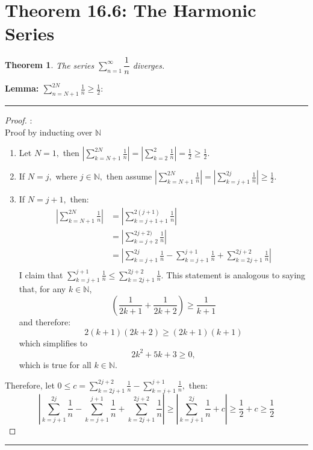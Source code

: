 \documentclass[openany, amssymb, psamsfonts]{amsart}
\newcommand{\bbN}{\mathbb{N}}
\newtheorem{thm}{Theorem}[section]
\theoremstyle{definition}
\numberwithin{equation}{section}
\begin{document}
\section*{Theorem 16.6: The Harmonic Series}
\begin{thm}
	\label{16.6}
	The series $\displaystyle \sum\limits_{n = 1}^{\infty} \dfrac{1}{n}$ diverges.
\end{thm}
\textbf{Lemma: $\sum\limits_{n=N+1}^{2N} \frac{1}{n} \geq \frac{1}{2}$}:
\vspace{4pt}     \hrule   \vspace{4pt}\begin{proof}:\\
Proof by inducting over $\bbN$
\begin{enumerate}
\item Let $N = 1,$ then $|\displaystyle\sum_{k = N+1}^{2N}\frac{1}{n}|  = |\displaystyle\sum_{k = 2}^{2}\frac{1}{n}| = \frac{1}{2}\geq \frac{1}{2}.$
\item If $N = j,$ where $j \in \bbN,$ then assume $|\displaystyle\sum_{k = N+1}^{2N}\frac{1}{n}|  = |\displaystyle\sum_{k = j+1}^{2j}\frac{1}{n}| \geq \frac{1}{2}.$
\item If $N = j+1,$ then: 
\begin{align*}
|\displaystyle\sum_{k = N+1}^{2N}\frac{1}{n}| &= |\displaystyle\sum_{k = j+1+1}^{2(j+1)}\frac{1}{n}|\\
&= |\displaystyle\sum_{k = j+2}^{2j+2)}\frac{1}{n}|\\
&= |\displaystyle\sum_{k = j+1}^{2j}\frac{1}{n}  - \displaystyle\sum_{k = j+1}^{j+1}\frac{1}{n} + \displaystyle\sum_{k = 2j+1}^{2j+2}\frac{1}{n}|\\
\end{align*}
I claim that $\displaystyle\sum_{k = j+1}^{j+1}\frac{1}{n} \leq \displaystyle\sum_{k = 2j+1}^{2j+2}\frac{1}{n}.$ This statement is analogous to saying that, for any $k \in \bbN$, \[(\frac{1}{2k + 1} + \frac{1}{2k + 2}) \geq \frac{1}{k +1}\] and therefore: 
\[2(k+1)(2k+2) \geq (2k+1)(k+1)\] which simplifies to \[2k^2 + 5k + 3 \geq 0,\] which is true for all $k\in \bbN.$ 
\end{enumerate}
Therefore, let $0\leq c = \displaystyle\sum_{k = 2j+1}^{2j+2}\frac{1}{n} - \displaystyle\sum_{k = j+1}^{j+1}\frac{1}{n},$ then: \[|\displaystyle\sum_{k = j+1}^{2j}\frac{1}{n}  - \displaystyle\sum_{k = j+1}^{j+1}\frac{1}{n} + \displaystyle\sum_{k = 2j+1}^{2j+2}\frac{1}{n}| \geq |\displaystyle\sum_{k = j+1}^{2j}\frac{1}{n} + c| \geq \frac{1}{2} +c\geq \frac{1}{2}\] 
\end{proof}\vspace{4pt}     \hrule   \vspace{4pt}
\end{document}
